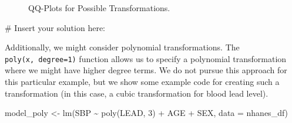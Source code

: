 \documentclass[
  letterpaper,
]{latex/krantz}
\makeatletter
\newenvironment{Shaded}{\begin{snugshade}}{\end{snugshade}}
\newcommand{\AttributeTok}[1]{\textcolor[rgb]{0.40,0.45,0.13}{#1}}
\newcommand{\CommentTok}[1]{\textcolor[rgb]{0.37,0.37,0.37}{#1}}
\newcommand{\DecValTok}[1]{\textcolor[rgb]{0.68,0.00,0.00}{#1}}
\newcommand{\FunctionTok}[1]{\textcolor[rgb]{0.28,0.35,0.67}{#1}}
\newcommand{\NormalTok}[1]{\textcolor[rgb]{0.00,0.23,0.31}{#1}}
\newcommand{\OtherTok}[1]{\textcolor[rgb]{0.00,0.23,0.31}{#1}}
\newcommand{\SpecialCharTok}[1]{\textcolor[rgb]{0.37,0.37,0.37}{#1}}
\newenvironment{kframe}{%
\medskip{}
\setlength{\fboxsep}{.8em}
 \def\at@end@of@kframe{}%
 \ifinner\ifhmode%
  \def\at@end@of@kframe{\end{minipage}}%
  \begin{minipage}{\columnwidth}%
 \fi\fi%
 \def\FrameCommand##1{\hskip\@totalleftmargin \hskip-\fboxsep
 \colorbox{shadecolor}{##1}\hskip-\fboxsep
     \hskip-\linewidth \hskip-\@totalleftmargin \hskip\columnwidth}%
 \MakeFramed {\advance\hsize-\width
   \@totalleftmargin\z@ \linewidth\hsize
   \@setminipage}}%
 {\par\unskip\endMakeFramed%
 \at@end@of@kframe}
\renewenvironment{Shaded}{\begin{kframe}}{\end{kframe}}
\makeatother
\begin{document}
\begin{figure}


\caption{\label{fig-qq-plots}QQ-Plots for Possible Transformations.}

\end{figure}%

\begin{Shaded}
\begin{Highlighting}[]
\CommentTok{\# Insert your solution here:}
\end{Highlighting}
\end{Shaded}

Additionally, we might consider polynomial transformations. The
\texttt{poly(x,\ degree=1)}
function allows us to specify a polynomial transformation where we might
have higher degree terms. We do not pursue this approach for this
particular example, but we show some example code for creating such a
transformation (in this case, a cubic transformation for blood lead
level).

\begin{Shaded}
\begin{Highlighting}[]
\NormalTok{model\_poly }\OtherTok{\textless{}{-}} \FunctionTok{lm}\NormalTok{(SBP }\SpecialCharTok{\textasciitilde{}} \FunctionTok{poly}\NormalTok{(LEAD, }\DecValTok{3}\NormalTok{) }\SpecialCharTok{+}\NormalTok{ AGE }\SpecialCharTok{+}\NormalTok{ SEX, }\AttributeTok{data =}\NormalTok{ nhanes\_df)}
\end{Highlighting}
\end{Shaded}
\end{document}

